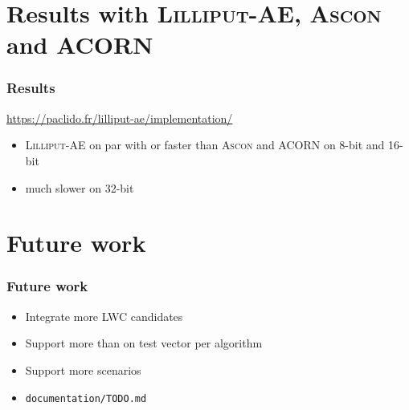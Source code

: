 \documentclass[english]{beamer}
\begin{document}
\section[Results]{Results with \textsc{Lilliput-AE}, \textsc{Ascon} and ACORN}

\begin{frame}
  \frametitle{Results}

  \url{https://paclido.fr/lilliput-ae/implementation/}

  \begin{itemize}
  \item \textsc{Lilliput-AE} on par with or faster than \textsc{Ascon} and ACORN on 8-bit and 16-bit
  \item much slower on 32-bit
  \end{itemize}

\end{frame}

\section[Future work]{Future work}

\begin{frame}
  \frametitle{Future work}

  \begin{itemize}
  \item Integrate more LWC candidates
  \item Support more than on test vector per algorithm
  \item Support more scenarios
  \item \texttt{documentation/TODO.md}
  \end{itemize}

\end{frame}
\end{document}
